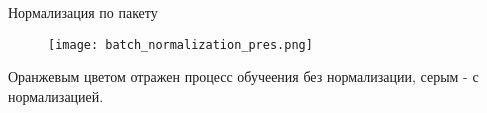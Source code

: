 
\begin{frame}{Нормализация по пакету}
\begin{figure}
\centering
\texttt{[image: batch\_normalization\_pres.png]}
\end{figure}
    Оранжевым цветом отражен процесс обучеения без нормализации, серым - с нормализацией.
\end{frame}